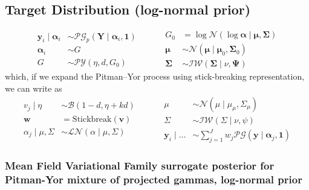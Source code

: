 
\subsection{Target Distribution (log-normal prior)}
\begin{equation}
    \begin{aligned}
        \bm{y}_i \mid \bm{\alpha}_i &\sim 
            \mathcal{PG}_p\left(\bm{Y}\mid\bm{\alpha}_{i},\bm{1}\right)\\
        \bm{\alpha}_i &\sim G\\
        G &\sim \mathcal{PY}\left(\eta, d, G_0\right)
    \end{aligned}
    ~\hspace{1cm}
    \begin{aligned}
        G_0 &= \log\mathcal{N}(\log\bm{\alpha}\mid \bm{\mu}, \bm{\Sigma})\\
        \bm{\mu} &\sim \mathcal{N}\left(\bm{\mu}\mid \bm{\mu}_0, \bm{\Sigma}_0\right)\\
        \bm{\Sigma} &\sim \mathcal{IW}\left(\bm{\Sigma}\mid\nu,\bm{\Psi}\right)
    \end{aligned}
\end{equation}
which, if we expand the Pitman--Yor process using stick-breaking representation, we can write as
\begin{equation}
    \begin{aligned}
        v_j \mid \eta &\sim \mathcal{B}(1 - d, \eta + kd)\\
        \bm{w} &= \text{Stickbreak}(\bm{v})\\
        \alpha_j\mid\mu,\Sigma &\sim \mathcal{LN}(\alpha\mid\mu,\Sigma)
    \end{aligned}
    ~\hspace{1cm}
    \begin{aligned}
        \mu &\sim\mathcal{N}(\mu\mid\mu_{\mu},\Sigma_{\mu})\\
        \Sigma &\sim \mathcal{IW}(\Sigma\mid\nu, \psi)\\
        \bm{y}_i\mid\ldots &\sim {\textstyle\sum}_{j = 1}^Jw_j\mathcal{PG}(\bm{y}\mid\bm{\alpha}_j,\bm{1})
    \end{aligned}
\end{equation}



\subsubsection{Mean Field Variational Family surrogate posterior for Pitman-Yor mixture of projected gammas, log-normal prior}

